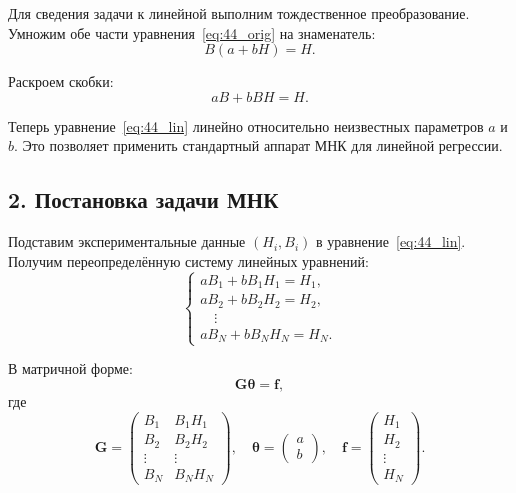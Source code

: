\documentclass{article}
\begin{document}
Для сведения задачи к линейной выполним тождественное преобразование. Умножим обе части уравнения~\eqref{eq:44_orig} на знаменатель:
\begin{equation}
B(a + bH) = H.
\end{equation}

Раскроем скобки:
\begin{equation}
aB + bBH = H.
\label{eq:44_lin}
\end{equation}

Теперь уравнение~\eqref{eq:44_lin} линейно относительно неизвестных параметров $a$ и $b$. Это позволяет применить стандартный аппарат МНК для линейной регрессии.

\subsection*{2. Постановка задачи МНК}

Подставим экспериментальные данные $(H_i, B_i)$ в уравнение~\eqref{eq:44_lin}. Получим переопределённую систему линейных уравнений:
\begin{equation}
\begin{cases}
a B_1 + b B_1 H_1 = H_1, \\
a B_2 + b B_2 H_2 = H_2, \\
\quad \vdots \\
a B_N + b B_N H_N = H_N.
\end{cases}
\end{equation}

В матричной форме:
\begin{equation}
\mathbf{G} \boldsymbol{\theta} = \mathbf{f},
\label{eq:44_slau}
\end{equation}
где
\begin{equation}
\mathbf{G} =
\begin{pmatrix}
B_1 & B_1 H_1 \\
B_2 & B_2 H_2 \\
\vdots & \vdots \\
B_N & B_N H_N
\end{pmatrix}, \quad
\boldsymbol{\theta} =
\begin{pmatrix}
a \\ b
\end{pmatrix}, \quad
\mathbf{f} =
\begin{pmatrix}
H_1 \\ H_2 \\ \vdots \\ H_N
\end{pmatrix}.
\end{equation}
\end{document}
